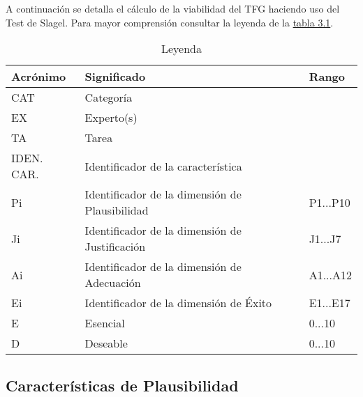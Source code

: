 A continuación se detalla el cálculo de la viabilidad del \acs{TFG} haciendo uso del Test de Slagel.
Para mayor comprensión consultar la leyenda de la \hyperref[tab:table3_1]{tabla 3.1}.

\begin{table}[]
  \centering
  \caption{Leyenda}
  \label{tab:table3_1}
  \begin{tabular}{|l|l|l|}
    \hline
    Acrónimo & Significado & Rango \\ \hline
    CAT & Categoría &  \\ \hline
    EX & Experto(s) &  \\ \hline
    TA & Tarea &  \\ \hline
    IDEN. CAR. & Identificador de la característica &  \\ \hline
    Pi & Identificador de la dimensión de Plausibilidad & P1...P10 \\ \hline
    Ji & Identificador de la dimensión de Justificación & J1...J7 \\ \hline
    Ai & Identificador de la dimensión de Adecuación & A1...A12 \\ \hline
    Ei & Identificador de la dimensión de Éxito & E1...E17 \\ \hline
    E & Esencial & 0...10 \\ \hline
    D & Deseable & 0...10 \\ \hline
  \end{tabular}
\end{table}



\subsection{Características de Plausibilidad}

